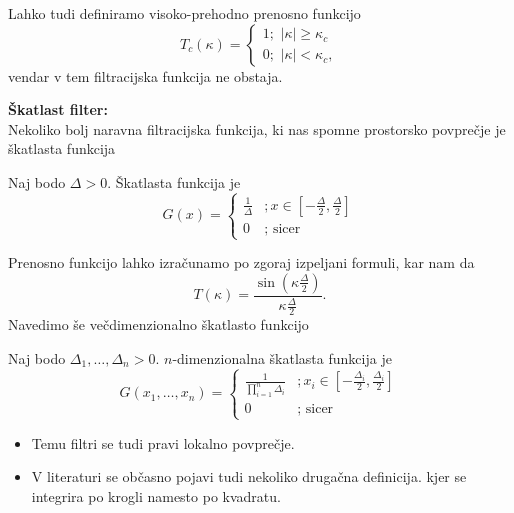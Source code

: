 \documentclass[mat2, tisk]{fmfdelo}
\begin{document}
\begin{opomba}
Lahko tudi definiramo visoko-prehodno prenosno funkcijo
$$
T_c(\kappa)=\left\{\begin{array}{l}
  1 ;\,\, |\kappa| \geq \kappa_c \\
  0 ;\,\, |\kappa| < \kappa_c,
\end{array}\right.
$$
vendar v tem filtracijska funkcija ne obstaja.
\end{opomba}


\noindent
\textbf{Škatlast filter:}\\
Nekoliko bolj naravna filtracijska funkcija, ki nas spomne prostorsko povprečje je 
škatlasta funkcija 
\begin{definicija}
Naj bodo $\Delta > 0$. Škatlasta funkcija je 
\begin{equation}
G(x)= \begin{cases}\frac{1}{\Delta} & ; x \in\left[-\frac{\Delta}{2}, \frac{\Delta}{2}\right] \\ 0 & ; \text { sicer }\end{cases}
\end{equation}
\end{definicija}

Prenosno funkcijo lahko izračunamo po zgoraj izpeljani formuli, kar nam da 
$$
T(\kappa) = \frac{\sin(\kappa \frac{\Delta}{2})}{\kappa \frac{\Delta}{2}}.
$$
Navedimo še večdimenzionalno škatlasto funkcijo
\begin{definicija}
Naj bodo $\Delta_1, \dots, \Delta_n > 0$. $n$-dimenzionalna
škatlasta funkcija je 
\begin{equation}
  G(x_1, \dots, x_n)= \begin{cases}\frac{1}{\prod_{i=1}^{n}\Delta_i} & ; x_i \in\left[-\frac{\Delta_i}{2}, \frac{\Delta_i}{2}\right] \\ 0 & ; \text { sicer }\end{cases}
\end{equation}  
\end{definicija}

\begin{opomba}
  \hfill
  \begin{itemize}
    \item Temu filtri se tudi pravi lokalno povprečje.
    \item V literaturi se občasno pojavi tudi nekoliko drugačna definicija. kjer 
    se integrira po krogli namesto po kvadratu.
  \end{itemize}
  \end{opomba}
  
\end{document}
